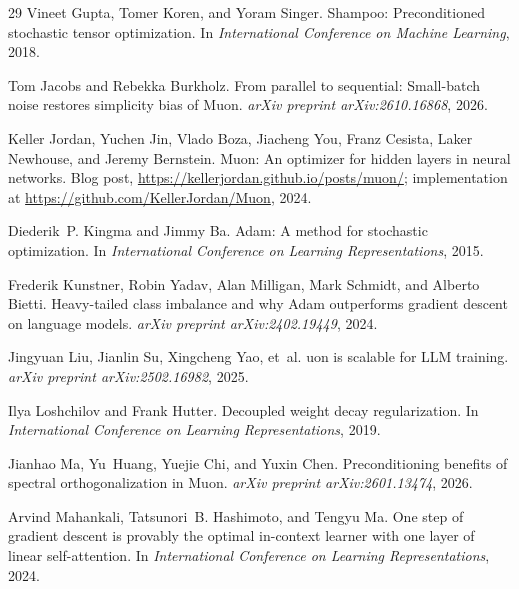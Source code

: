 \documentclass{article}
\begin{document}
\begin{thebibliography}{29}
Vineet Gupta, Tomer Koren, and Yoram Singer.
\newblock Shampoo: Preconditioned stochastic tensor optimization.
\newblock In \emph{International Conference on Machine Learning}, 2018.

Tom Jacobs and Rebekka Burkholz.
\newblock From parallel to sequential: Small-batch noise restores simplicity
  bias of {M}uon.
\newblock \emph{arXiv preprint arXiv:2610.16868}, 2026.

Keller Jordan, Yuchen Jin, Vlado Boza, Jiacheng You, Franz Cesista, Laker
  Newhouse, and Jeremy Bernstein.
\newblock Muon: An optimizer for hidden layers in neural networks.
\newblock Blog post, \url{https://kellerjordan.github.io/posts/muon/};
  implementation at \url{https://github.com/KellerJordan/Muon}, 2024.

Diederik~P. Kingma and Jimmy Ba.
\newblock Adam: A method for stochastic optimization.
\newblock In \emph{International Conference on Learning Representations}, 2015.

Frederik Kunstner, Robin Yadav, Alan Milligan, Mark Schmidt, and Alberto
  Bietti.
\newblock Heavy-tailed class imbalance and why {A}dam outperforms gradient
  descent on language models.
\newblock \emph{arXiv preprint arXiv:2402.19449}, 2024.

Jingyuan Liu, Jianlin Su, Xingcheng Yao, et~al.
uon is scalable for {LLM} training.
\newblock \emph{arXiv preprint arXiv:2502.16982}, 2025.

Ilya Loshchilov and Frank Hutter.
\newblock Decoupled weight decay regularization.
\newblock In \emph{International Conference on Learning Representations}, 2019.

Jianhao Ma, Yu~Huang, Yuejie Chi, and Yuxin Chen.
\newblock Preconditioning benefits of spectral orthogonalization in {M}uon.
\newblock \emph{arXiv preprint arXiv:2601.13474}, 2026.

Arvind Mahankali, Tatsunori~B. Hashimoto, and Tengyu Ma.
\newblock One step of gradient descent is provably the optimal in-context
  learner with one layer of linear self-attention.
\newblock In \emph{International Conference on Learning Representations}, 2024.


\end{thebibliography}
\end{document}
